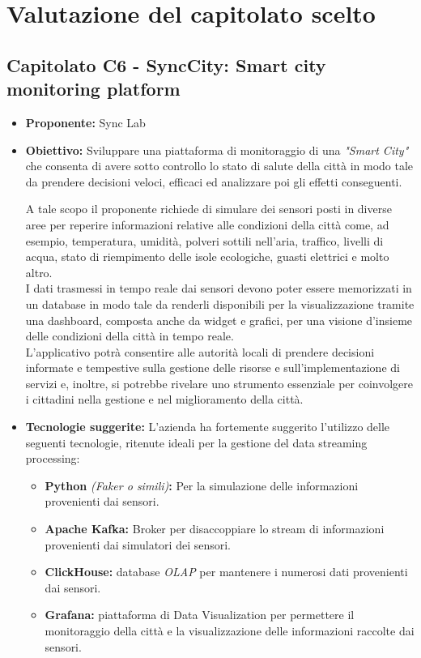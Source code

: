 \documentclass{article}
\begin{document}

\section{Valutazione del capitolato scelto}

\subsection{\textbf{Capitolato C6} - SyncCity: Smart city monitoring platform}
\begin{itemize}
    \item[] \textbf{Proponente:} Sync Lab
    
    \item[] \textbf{Obiettivo:} Sviluppare una piattaforma di monitoraggio di una \textit{"Smart City"} che consenta di avere sotto controllo lo stato di salute della città in modo tale da prendere decisioni veloci, efficaci ed analizzare poi gli effetti conseguenti.
    
    A tale scopo il proponente richiede di simulare dei sensori posti in diverse aree per reperire informazioni relative alle condizioni della città come, ad esempio, temperatura, umidità, polveri sottili nell'aria, traffico, livelli di acqua, stato di riempimento delle isole ecologiche, guasti elettrici e molto altro. \\
    I dati trasmessi in tempo reale dai sensori devono poter essere memorizzati in un database in modo tale da renderli disponibili per la visualizzazione tramite una dashboard, composta anche da widget e grafici, per una visione d'insieme delle condizioni della città in tempo reale. \\
    L'applicativo potrà consentire alle autorità locali di prendere decisioni informate e tempestive sulla gestione delle risorse e sull'implementazione di servizi e, inoltre, si potrebbe rivelare uno strumento essenziale per coinvolgere i cittadini nella gestione e nel miglioramento della città.
    
    \item[] \textbf{Tecnologie suggerite:} L’azienda ha fortemente suggerito l’utilizzo delle seguenti tecnologie, ritenute ideali per la gestione del data streaming processing:
    \begin{itemize}
        \item \textbf{Python} \textit{(Faker o simili)}\textbf{:} Per la simulazione delle informazioni provenienti dai sensori. 
        \item \textbf{Apache Kafka:} Broker per disaccoppiare lo stream di informazioni provenienti dai simulatori dei sensori.
        \item \textbf{ClickHouse:} database \textit{OLAP} per mantenere i numerosi dati provenienti dai sensori.
        \item \textbf{Grafana:} piattaforma di Data Visualization per permettere il monitoraggio della città e la visualizzazione delle informazioni raccolte dai sensori.
    \end{itemize}
    

\end{itemize}
\end{document}
